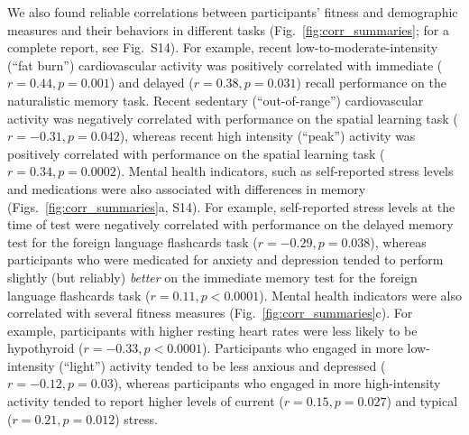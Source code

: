 \documentclass[10pt]{article}
\newcommand{\allCorr}{S14}
\begin{document}
We also found reliable correlations between participants' fitness and
demographic measures and their behaviors in different tasks
(Fig.~\ref{fig:corr_summaries}; for a complete report, see Fig.~\allCorr).
For example, recent low-to-moderate-intensity (``fat burn'')
cardiovascular activity was positively correlated with immediate
($r = 0.44, p = 0.001$) and delayed ($r = 0.38, p = 0.031$) recall
performance on the naturalistic memory task.  Recent sedentary
(``out-of-range'') cardiovascular activity was negatively correlated
with performance on the spatial learning task
($r = -0.31, p = 0.042$), whereas recent high intensity (``peak'')
activity was positively correlated with performance on the spatial
learning task ($r = 0.34, p = 0.0002$).  Mental health indicators,
such as self-reported stress levels and medications were also
associated with differences in memory
(Figs.~\ref{fig:corr_summaries}a, \allCorr).  For example,
self-reported stress levels at the time of test were negatively
correlated with performance on the delayed memory test for the foreign
language flashcards task ($r = -0.29, p = 0.038$), whereas
participants who were medicated for anxiety and depression tended to
perform slightly (but reliably) \textit{better} on the immediate
memory test for the foreign language flashcards task
($r = 0.11, p < 0.0001$).  Mental health indicators were also
correlated with several fitness measures
(Fig.~\ref{fig:corr_summaries}c).  For example, participants with
higher resting heart rates were less likely to be hypothyroid ($r =
-0.33, p < 0.0001$).  Participants who engaged in more low-intensity
(``light'') activity tended to be less anxious and depressed ($r =
-0.12, p = 0.03$), whereas participants who engaged in more
high-intensity activity tended to report higher levels of current ($r
= 0.15, p = 0.027$) and typical ($r = 0.21, p = 0.012$) stress.
\end{document}

